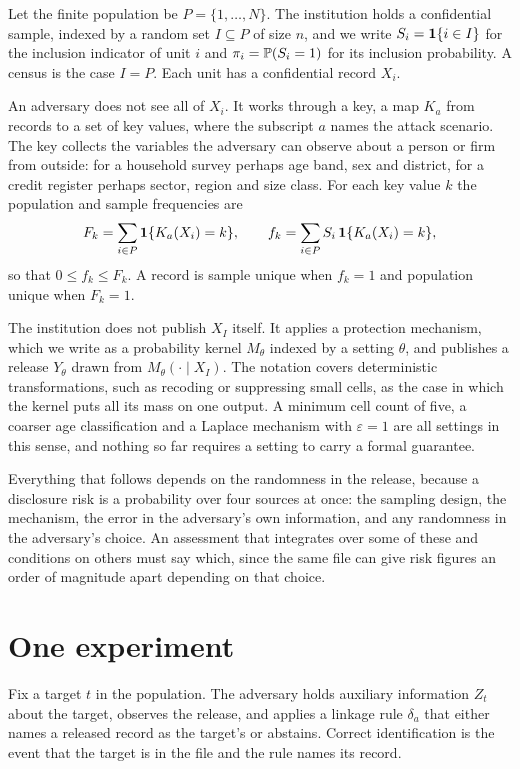 Let the finite population be $P = \{1,\dots,N\}$. The institution holds a
confidential sample, indexed by a random set $I \subseteq P$ of size $n$, and we
write $S_i = \mathbf{1}\{i \in I\}$ for the inclusion indicator of unit $i$ and
$\pi_i = \mathbb{P}(S_i = 1)$ for its inclusion probability. A census is the case
$I = P$. Each unit has a confidential record $X_i$.

An adversary does not see all of $X_i$. It works through a key, a map $K_a$ from
records to a set of key values, where the subscript $a$ names the attack scenario.
The key collects the variables the adversary can observe about a person or firm
from outside: for a household survey perhaps age band, sex and district, for a
credit register perhaps sector, region and size class. For each key value $k$ the
population and sample frequencies are
\begin{equation}\label{eq:freq}
F_k = \sum_{i \in P} \mathbf{1}\{K_a(X_i) = k\}, \qquad
f_k = \sum_{i \in P} S_i\, \mathbf{1}\{K_a(X_i) = k\},
\end{equation}
so that $0 \le f_k \le F_k$. A record is sample unique when $f_k = 1$ and population
unique when $F_k = 1$.

The institution does not publish $X_I$ itself. It applies a protection mechanism,
which we write as a probability kernel $M_\theta$ indexed by a setting $\theta$, and
publishes a release $Y_\theta$ drawn from $M_\theta(\cdot \mid X_I)$. The notation
covers deterministic transformations, such as recoding or suppressing small cells,
as the case in which the kernel puts all its mass on one output. A minimum cell
count of five, a coarser age classification and a Laplace mechanism with
$\varepsilon = 1$ are all settings in this sense, and nothing so far requires a
setting to carry a formal guarantee.

Everything that follows depends on the randomness in the release, because a
disclosure risk is a probability over four sources at once: the sampling design,
the mechanism, the error in the adversary's own information, and any randomness in
the adversary's choice. An assessment that integrates over some of these and
conditions on others must say which, since the same file can give risk figures an
order of magnitude apart depending on that choice.

\section{One experiment}

Fix a target $t$ in the population. The adversary holds auxiliary information
$Z_t$ about the target, observes the release, and applies a linkage rule
$\delta_a$ that either names a released record as the target's or abstains.
Correct identification is the event that the target is in the file and the rule
names its record.

